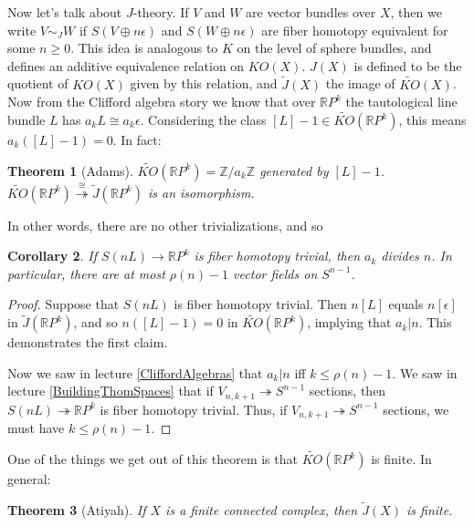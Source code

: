 \documentclass{article}
\newcommand{\Z}{\mathbb{Z}}
\newcommand{\R}{\mathbb{R}}
\newcommand{\RP}{\R P}
\newcommand{\onto}{\twoheadrightarrow}
\renewcommand{\to}{\longrightarrow}
\newtheorem{thm}{Theorem}[section]
\newtheorem{cor}[thm]{Corollary}
\theoremstyle{definition}
\begin{document}
Now let's talk about $J$-theory.  If $V$ and $W$ are vector bundles over $X$, then we write $V \sim_J W$ if $S(V \oplus n \epsilon)$ and $S(W \oplus n \epsilon)$ are fiber homotopy equivalent for some $n\geq0$. This idea is analogous to $K$ on the level of sphere bundles, and defines an additive equivalence relation on $KO(X)$. $J(X)$ is defined to be the quotient of $KO(X)$ given by this relation, and $\widetilde J(X)$ the image of $\widetilde{KO}(X)$. %
Now from the Clifford algebra story we know that over $\RP^k$ the tautological line bundle $L$ has $a_k L \cong a_k \epsilon$. %
Considering the class $[L] - 1 \in \widetilde{KO}(\RP^k)$, this means $a_k([L] - 1) = 0$. In fact: %
\begin{thm}[Adams]\label{AdamsKORPn}
$\widetilde{KO}(\RP^k)=\Z/a_k\Z$ generated by $[L]-1$.
$\widetilde{KO}(\RP^k) \stackrel{\cong}{\onto} \widetilde J(\RP^k)$ is an isomorphism.
\end{thm}
In other words, there are no other trivializations, and so %
\begin{cor}
If $S(nL) \to \RP^k$ is fiber homotopy trivial, then $a_k$ divides $n$. In particular, there are at most $\rho(n) - 1$ vector fields on $S^{n-1}$. %
\end{cor}
\begin{proof}
Suppose that $S(nL)$ is fiber homotopy trivial. Then $n[L]$ equals $n[\epsilon]$ in $\widetilde J(\R P^k)$, and so $n([L]-1)=0$ in $\widetilde{KO}(\RP^k)$, implying that $a_k|n$. This demonstrates the first claim.

Now we saw in lecture \ref{CliffordAlgebras} that $a_k|n$ iff $k\leq \rho(n)-1$. We saw in lecture \ref{BuildingThomSpaces} that if $V_{n, k+1} \onto S^{n-1}$ sections, then $S(nL)\onto \R P^{k}$ is fiber homotopy trivial. Thus, if $V_{n, k+1} \onto S^{n-1}$ sections, we must have $k\leq\rho(n)-1$.
\end{proof}
One of the things we get out of this theorem is that $\widetilde{KO}(\RP^k)$ is finite. In general: %
\begin{thm}[Atiyah]
If $X$ is a finite connected complex, then $\widetilde J(X)$ is finite.
\end{thm}
\end{document}
